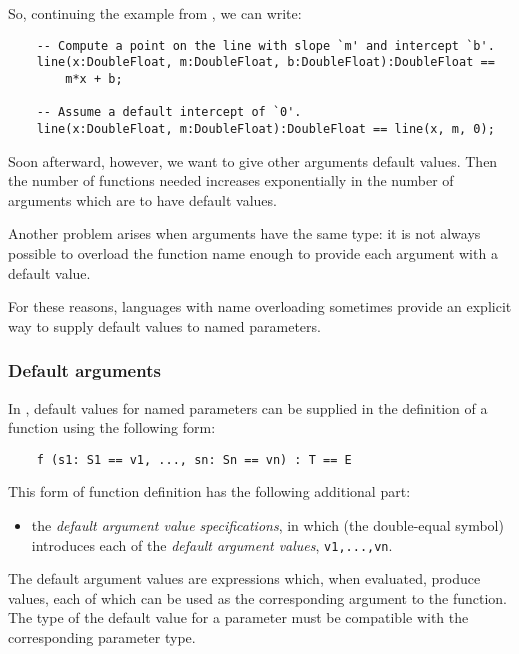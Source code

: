 So, continuing the example from , we can write:

\begin{small}
\begin{verbatim}
    -- Compute a point on the line with slope `m' and intercept `b'.
    line(x:DoubleFloat, m:DoubleFloat, b:DoubleFloat):DoubleFloat ==
        m*x + b;

    -- Assume a default intercept of `0'.
    line(x:DoubleFloat, m:DoubleFloat):DoubleFloat == line(x, m, 0); 
\end{verbatim}
\end{small}

Soon afterward, however, we want to give other arguments default values.
Then the number of functions needed increases exponentially in the number
of arguments which are to have default values.  

Another problem arises when arguments have the same type:
it is not always possible to overload the function name enough to
provide each argument with a default value.

For these reasons, languages with name overloading sometimes provide
an explicit way to supply default values to named parameters.

\subsubsection{Default arguments}

In \asharp{}, default values for named parameters can be supplied in
the definition of a function using the following form:

\begin{small}
\begin{verbatim}
    f (s1: S1 == v1, ..., sn: Sn == vn) : T == E
\end{verbatim}
\end{small}

This form of function definition has the following additional part:
\begin{itemize}
\item the {\em default argument value specifications\/}, in which
\ttin{==} (the \linebreak double-equal symbol) introduces each of the
{\em default argument values\/}, {\tt v1,...,vn}.
\end{itemize}

The default argument values are expressions which, when evaluated,
produce values, each of which can be used as the corresponding argument
to the function.  The type of the default value for a parameter must be
compatible with the corresponding parameter type.

